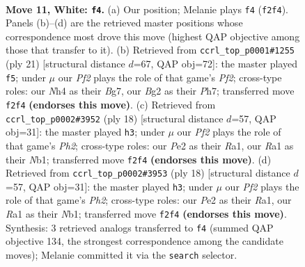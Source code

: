 \documentclass[11pt]{article}
\begin{document}
\clearpage

\begin{figure}[p]\centering
\begin{subfigure}{0.46\textwidth}\centering
\resizebox{\linewidth}{!}{%
\newchessgame
\chessboard[
  setfen={r1bq1rk1/pp5p/n1pb1np1/3p1p2/3P3N/6P1/PP1NPPBP/R1BQR1K1 w - - 0 11},
  showmover=false,
  pgfstyle=straightmove, color=movearrow, markmove={f2-f4}
]}
\caption{}
\end{subfigure}\hfill
\begin{subfigure}{0.46\textwidth}\centering
\resizebox{\linewidth}{!}{%
\newchessgame
\chessboard[
  setfen={r1bq1rk1/1ppn1pbp/3p2p1/p7/3Pn3/N1P2N1P/PP2BPPB/R2Q1RK1 b - - 0 11},
  showmover=false,
  pgfstyle=straightmove, color=movearrow, markmove={f7-f5}
]}
\caption{}
\end{subfigure}
\\[4pt]
\begin{subfigure}{0.46\textwidth}\centering
\resizebox{\linewidth}{!}{%
\newchessgame
\chessboard[
  setfen={rn1q1rk1/pp2ppbp/2p1b1p1/3nN3/3P4/1B6/PPP2PPP/RNBQR1K1 w - - 0 10},
  showmover=false,
  pgfstyle=straightmove, color=movearrow, markmove={h2-h3}
]}
\caption{}
\end{subfigure}\hfill
\begin{subfigure}{0.46\textwidth}\centering
\resizebox{\linewidth}{!}{%
\newchessgame
\chessboard[
  setfen={rn1q1rk1/pp2ppbp/2p1b1p1/3nN3/3P4/1B6/PPP2PPP/RNBQR1K1 w - - 0 10},
  showmover=false,
  pgfstyle=straightmove, color=movearrow, markmove={h2-h3}
]}
\caption{}
\end{subfigure}
\caption{\textbf{Move 11, White: \texttt{f4}.} (a) Our position; Melanie plays \texttt{f4} (\texttt{f2f4}). Panels (b)--(d) are the retrieved master positions whose correspondence most drove this move (highest QAP objective among those that transfer to it). (b) Retrieved from \texttt{ccrl\_top\_p0001\#1255} (ply 21) [structural distance $d$=67, QAP obj=72]: the master played \texttt{f5}; under $\mu$ our \emph{Pf2} plays the role of that game's \emph{Pf2}; cross-type roles: our \emph{N}h4 as their \emph{B}g7, our \emph{B}g2 as their \emph{P}h7; transferred move \texttt{f2f4} \textbf{(endorses this move)}. (c) Retrieved from \texttt{ccrl\_top\_p0002\#3952} (ply 18) [structural distance $d$=57, QAP obj=31]: the master played \texttt{h3}; under $\mu$ our \emph{Pf2} plays the role of that game's \emph{Ph2}; cross-type roles: our \emph{P}e2 as their \emph{R}a1, our \emph{R}a1 as their \emph{N}b1; transferred move \texttt{f2f4} \textbf{(endorses this move)}. (d) Retrieved from \texttt{ccrl\_top\_p0002\#3953} (ply 18) [structural distance $d$=57, QAP obj=31]: the master played \texttt{h3}; under $\mu$ our \emph{Pf2} plays the role of that game's \emph{Ph2}; cross-type roles: our \emph{P}e2 as their \emph{R}a1, our \emph{R}a1 as their \emph{N}b1; transferred move \texttt{f2f4} \textbf{(endorses this move)}. Synthesis: 3 retrieved analogs transferred to \texttt{f4} (summed QAP objective 134, the strongest correspondence among the candidate moves); Melanie committed it via the \texttt{search} selector.}
\label{fig:thought-m20}
\end{figure}
\end{document}
